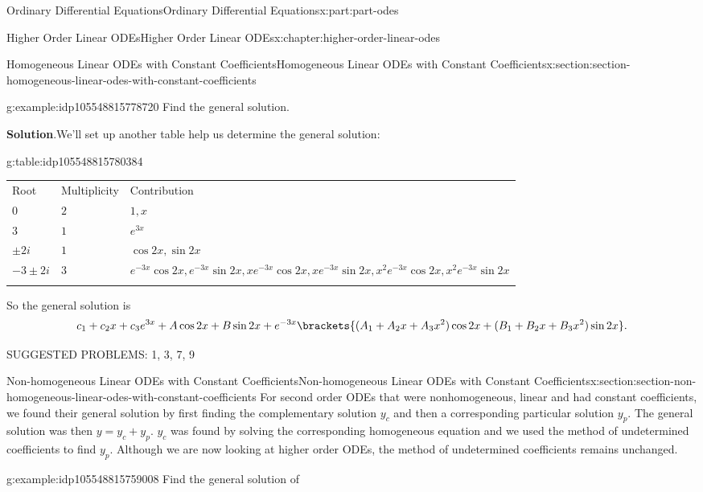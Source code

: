 \documentclass[twoside,10pt,]{book}
\newcommand{\blocktitlefont}{\relax}
\newcommand{\tabularfont}{\relax}
\numberwithin{equation}{part}
\newcommand{\hrulethick} {\noalign{\hrule height 0.11em}}
\begin{document}
\begin{partptx}{Ordinary Differential Equations}{}{Ordinary Differential Equations}{}{}{x:part:part-odes}
\begin{chapterptx}{Higher Order Linear ODEs}{}{Higher Order Linear ODEs}{}{}{x:chapter:higher-order-linear-odes}
\begin{sectionptx}{Homogeneous Linear ODEs with Constant Coefficients}{}{Homogeneous Linear ODEs with Constant Coefficients}{}{}{x:section:section-homogeneous-linear-odes-with-constant-coefficients}
\begin{example}{}{g:example:idp105548815778720}
Find the general solution.%
\par\smallskip%
\noindent\textbf{\blocktitlefont Solution}.\hypertarget{g:solution:idp105548815780000}{}\quad{}We'll set up another table help us determine the general solution:%
\begin{tableptx}{\textbf{}}{g:table:idp105548815780384}{}%
\centering%
{\tabularfont%
\begin{tabular}{lll}\hrulethick
Root&Multiplicity&Contribution\tabularnewline\hrulethick
\(0\)&\(2\)&\(1,x\)\tabularnewline\hrulethick
\(3\)&\(1\)&\(e^{3x}\)\tabularnewline\hrulethick
\(\pm2i\)&\(1\)&\(\cos2x,\sin2x\)\tabularnewline\hrulethick
\(-3\pm2i\)&\(3\)&\(e^{-3x}\cos2x,e^{-3x}\sin2x,xe^{-3x}\cos2x,xe^{-3x}\sin2x,x^{2}e^{-3x}\cos2x,x^{2}e^{-3x}\sin2x\)\tabularnewline\hrulethick
\end{tabular}
}%
\end{tableptx}%
So the general solution is%
\begin{equation*}
c_{1}+c_{2}x+c_{3}e^{3x}+A\cos2x+B\sin2x+e^{-3x}\brackets{(A_{1}+A_{2}x+A_{3}x^{2})\cos2x+(B_{1}+B_{2}x+B_{3}x^{2})\sin2x}.
\end{equation*}
%
\end{example}
\begin{conclusion}{}%
SUGGESTED PROBLEMS: 1, 3, 7, 9%
\end{conclusion}%
\end{sectionptx}
%
%
\typeout{************************************************}
\typeout{************************************************}
%
\begin{sectionptx}{Non-homogeneous Linear ODEs with Constant Coefficients}{}{Non-homogeneous Linear ODEs with Constant Coefficients}{}{}{x:section:section-non-homogeneous-linear-odes-with-constant-coefficients}
For second order ODEs that were nonhomogeneous, linear and had constant coefficients, we found their general solution by first finding the complementary solution \(y_{c}\) and then a corresponding particular solution \(y_{p}\). The general solution was then \(y=y_{c}+y_{p}\). \(y_{c}\) was found by solving the corresponding homogeneous equation and we used the method of undetermined coefficients to find \(y_{p}\). Although we are now looking at higher order ODEs, the method of undetermined coefficients remains unchanged.%
\begin{example}{}{g:example:idp105548815759008}%
Find the general solution of%
\begin{equation*}

\end{equation*}
\end{example}
\end{sectionptx}
\end{chapterptx}
\end{partptx}
\end{document}
